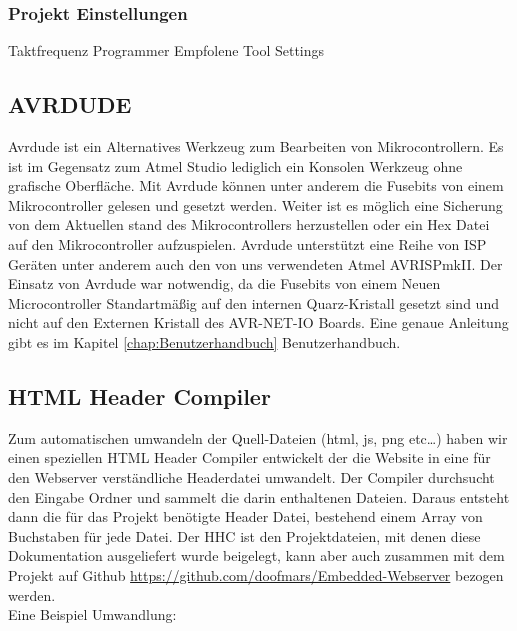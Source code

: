 \subsubsection{Projekt Einstellungen}

Taktfrequenz
Programmer
Empfolene Tool Settings

\subsection{AVRDUDE}

Avrdude ist ein Alternatives Werkzeug zum Bearbeiten von Mikrocontrollern. Es
ist im Gegensatz zum Atmel Studio lediglich ein Konsolen Werkzeug ohne
grafische Oberfläche. Mit Avrdude können unter anderem die Fusebits von einem
Mikrocontroller gelesen und gesetzt werden. Weiter ist es möglich eine Sicherung
von dem Aktuellen stand des Mikrocontrollers herzustellen oder ein Hex Datei auf
den Mikrocontroller aufzuspielen. Avrdude unterstützt eine Reihe von ISP Geräten
unter anderem auch den von uns verwendeten Atmel AVRISPmkII. Der Einsatz von
Avrdude war notwendig, da die Fusebits von einem Neuen Microcontroller
Standartmäßig auf den internen Quarz-Kristall gesetzt sind und nicht auf den
Externen Kristall des AVR-NET-IO Boards.
Eine genaue Anleitung gibt es im Kapitel \ref{chap:Benutzerhandbuch}
Benutzerhandbuch.

\subsection{HTML Header Compiler}
\label{chap:hintergrund.HHC}

Zum automatischen umwandeln der Quell-Dateien (html, js, png etc\ldots) haben
wir einen speziellen HTML Header Compiler entwickelt der die Website in eine
für den Webserver verständliche Headerdatei umwandelt. Der Compiler durchsucht
den Eingabe Ordner und sammelt die darin enthaltenen Dateien. Daraus entsteht
dann die für das Projekt benötigte Header Datei, bestehend einem Array von
Buchstaben für jede Datei. Der \ac{HHC} ist den Projektdateien, mit denen diese
Dokumentation ausgeliefert wurde beigelegt, kann aber auch zusammen mit dem
Projekt auf Github \url{https://github.com/doofmars/Embedded-Webserver}
bezogen werden.\\

Eine Beispiel Umwandlung: 

